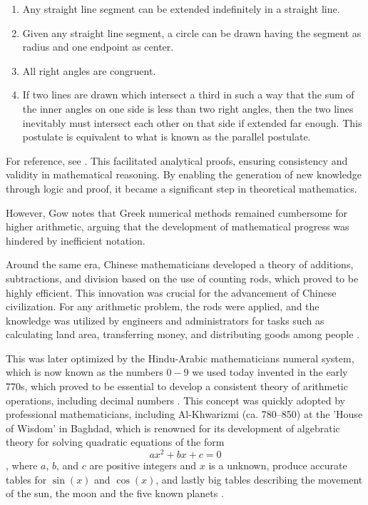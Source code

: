 \documentclass[10pt,conference]{IEEEtran}
\begin{document}
\begin{sloppy}
\begin{enumerate}
\item Any straight line segment can be extended indefinitely in a straight line.

\item Given any straight line segment, a circle can be drawn having the segment as radius and one endpoint as center.

\item All right angles are congruent.

\item If two lines are drawn which intersect a third in such a way that the sum of the inner angles on one side is less than two right angles, then the two lines inevitably must intersect each other on that side if extended far enough. This postulate is equivalent to what is known as the parallel postulate.
\end{enumerate}
For reference, see \cite{weissteinEuclidsPostulates}. This facilitated analytical proofs, ensuring consistency and validity in mathematical reasoning. By enabling the generation of new knowledge through logic and proof, it became a significant step
in theoretical mathematics.

However, Gow \cite{gow2010short} notes that Greek numerical methods remained cumbersome for higher arithmetic, arguing that the development of mathematical progress was hindered by inefficient notation.

Around the same era, Chinese mathematicians developed a theory of additions, subtractions, and division based on the use of counting rods, which proved to be highly efficient. This innovation was crucial for the advancement of Chinese civilization. For any arithmetic problem, the rods were applied, and the knowledge was utilized by engineers and administrators for tasks such as calculating land area, transferring money, and distributing goods among people \cite{yong1996development}.

This was later optimized by the Hindu-Arabic mathematicians numeral system, which is now known as the numbers $0-9$ we used today invented in the early 770s, which proved to be essential to develop a consistent theory of arithmetic
operations, including decimal numbers \cite{kunitzsch2003transmission}.
This concept was quickly adopted by professional mathematicians, including Al-Khwarizmi (ca. 780–850) at the 'House of Wisdom' in Baghdad, which is renowned for its development of algebratic theory for solving quadratic equations of the form $$ax^{2}
+ bx + c = 0$$, where $a$, $b$, and $c$ are positive integers and $x$ is a unknown, produce accurate tables for $\sin(x)$  and $\cos(x)$, and lastly big tables describing the movement of the sun, the moon and the five known planets \cite{van2013history}.



\end{sloppy}
\end{document}
